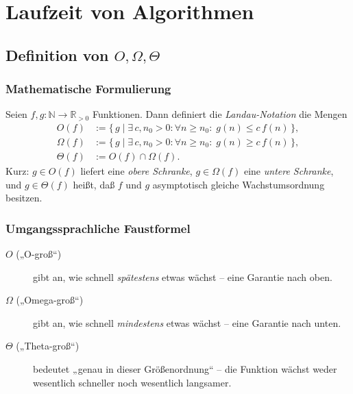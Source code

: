 
\chapter{Laufzeit von Algorithmen}

\section{Definition von $O,\Omega,\Theta$}
\subsection*{Mathematische Formulierung}
Seien $f,g\colon \mathbb N \to \mathbb R_{>0}$ Funktionen. Dann definiert die
\emph{Landau-Notation} die Mengen
\begin{align*}
  O(f)      &:= \{\,g \mid \exists\,c,n_0>0: \forall n\ge n_0:\; g(n)\le c\,f(n)\,\},\\
  \Omega(f) &:= \{\,g \mid \exists\,c,n_0>0: \forall n\ge n_0:\; g(n)\ge c\,f(n)\,\},\\
  \Theta(f) &:= O(f)\cap\Omega(f).
\end{align*}
Kurz: $g\in O(f)$ liefert eine \emph{obere Schranke}, $g\in\Omega(f)$ eine
\emph{untere Schranke}, und $g\in\Theta(f)$ heißt, daß $f$ und $g$ asymptotisch
gleiche Wachstumsordnung besitzen.

\subsection*{Umgangssprachliche Faustformel}
\begin{description}
  \item[$O$ („O-groß“)] gibt an, wie schnell \emph{spätestens} etwas wächst – eine Garantie nach oben.
  \item[$\Omega$ („Omega-groß“)] gibt an, wie schnell \emph{mindestens} etwas wächst – eine Garantie nach unten.
  \item[$\Theta$ („Theta-groß“)] bedeutet „genau in dieser Größenordnung“ – die Funktion wächst weder wesentlich schneller noch wesentlich langsamer.
\end{description}

